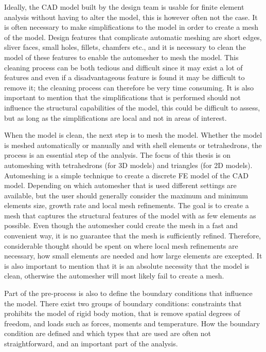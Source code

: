 Ideally, the CAD model built by the design team is usable for finite element analysis without having to alter the model, this is however often not the case. It is often necessary to make simplifications to the model in order to create a mesh of the model. Design features that complicate automatic meshing are short edges, sliver faces, small holes, fillets, chamfers etc., and it is necessary to clean the model of these features to enable the automesher to mesh the model. This cleaning process can be both tedious and difficult since it may exist a lot of features and even if a disadvantageous feature is found it may be difficult to remove it; the cleaning process can therefore be very time consuming. It is also important to mention that the simplifications that is performed should not influence the structural capabilities of the model, this could be difficult to assess, but as long as the simplifications are local and not in areas of interest.~\cite[p.~181--191]{adams99}

When the model is clean, the next step is to mesh the model. Whether the model is meshed automatically or manually and with shell elements or tetrahedrons, the process is an essential step of the analysis. The focus of this thesis is on automeshing with tetrahedrons (for 3D models) and triangles (for 2D models). Automeshing is a simple technique to create a discrete FE model of the CAD model. Depending on which automesher that is used different settings are available, but the user should generally consider the maximum and minimum elements size, growth rate and local mesh refinements. The goal is to create a mesh that captures the structural features of the model with as few elements as possible. Even though the automesher could create the mesh in a fast and convenient way, it is no guarantee that the mesh is sufficiently refined. Therefore, considerable thought should be spent on where local mesh refinements are necessary, how small elements are needed and how large elements are excepted. It is also important to mention that it is an absolute necessity that the model is clean, otherwise the automesher will most likely fail to create a mesh.~\cite[p.~251-255]{adams99}

Part of the pre-process is also to define the boundary conditions that influence the model. There exist two groups of boundary conditions: constraints that prohibits the model of rigid body motion, that is remove spatial degrees of freedom, and loads such as forces, moments and temperature. How the boundary condition are defined and which types that are used are often not straightforward, and an important part of the analysis.~\cite[p.~263]{adams99}

